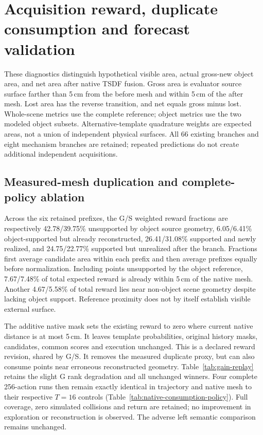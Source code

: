\section{Acquisition reward, duplicate consumption and forecast validation}
\label{sec:acquisition-supplement}
These diagnostics distinguish hypothetical visible area, actual gross-new object area, and net area after native TSDF fusion. Gross area is evaluator source surface farther than 5\,cm from the before mesh and within 5\,cm of the after mesh. Lost area has the reverse transition, and net equals gross minus lost. Whole-scene metrics use the complete reference; object metrics use the two modeled object subsets. Alternative-template quadrature weights are expected areas, not a union of independent physical surfaces. All 66 existing branches and eight mechanism branches are retained; repeated predictions do not create additional independent acquisitions.

\subsection{Measured-mesh duplication and complete-policy ablation}
Across the six retained prefixes, the G/S weighted reward fractions are respectively 42.78/39.75\% unsupported by object source geometry, 6.05/6.41\% object-supported but already reconstructed, 26.41/31.08\% supported and newly realized, and 24.75/22.77\% supported but unrealized after the branch. Fractions first average candidate area within each prefix and then average prefixes equally before normalization. Including points unsupported by the object reference, 7.67/7.48\% of total expected reward is already within 5\,cm of the native mesh. Another 4.67/5.58\% of total reward lies near non-object scene geometry despite lacking object support. Reference proximity does not by itself establish visible external surface.

The additive native mask sets the existing reward to zero where current native distance is at most 5\,cm. It leaves template probabilities, original history masks, candidates, common scores and execution unchanged. This is a declared reward revision, shared by G/S. It removes the measured duplicate proxy, but can also consume points near erroneous reconstructed geometry. Table~\ref{tab:gain-replay} retains the slight G rank degradation and all unchanged winners. Four complete 256-action runs then remain exactly identical in trajectory and native mesh to their respective $T=16$ controls (Table~\ref{tab:native-consumption-policy}). Full coverage, zero simulated collisions and return are retained; no improvement in exploration or reconstruction is observed. The adverse left semantic comparison remains unchanged.



